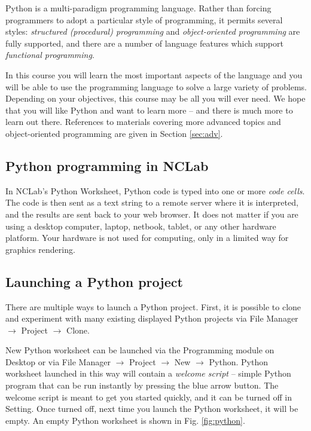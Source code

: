 \documentclass[article,A4,12pt]{llncs}
\begin{document}
Python is a multi-paradigm programming language. Rather than forcing programmers to 
adopt a particular style of programming, it permits several styles: {\em structured (procedural) 
programming} and {\em object-oriented programming} are fully supported, and there are a number 
of language features which support {\em functional programming}. 

In this course you will 
learn the most important aspects of the language and you will be able to 
use the programming language to solve a large variety of problems. 
Depending on your objectives, this course may be all you will ever need. 
We hope that you will like Python and want to learn more -- and there is much 
more to learn out there. References to materials covering more advanced topics 
and object-oriented programming are given in Section \ref{sec:adv}.

\subsection{Python programming in NCLab}

In NCLab's Python Worksheet, Python code is typed into one or more {\em code cells}. 
The code is then sent as a text string to a remote server where it is interpreted, and the 
results are sent back to your web browser. It does not matter if you are using a desktop 
computer, laptop, netbook, tablet, or any other hardware platform. Your hardware
is not used for computing, only in a limited way for graphics rendering.


\subsection{Launching a Python project}


There are multiple ways to launch a Python project. First, it is 
possible to clone and experiment with many existing displayed Python 
projects via File Manager $\rightarrow$ 
Project $\rightarrow$ Clone. 

New Python worksheet can be launched via 
the Programming module on Desktop or via File Manager $\rightarrow$ 
Project $\rightarrow$ New $\rightarrow$ Python. Python worksheet
launched in this way will contain a {\em welcome script} -- simple Python 
program that can be run instantly by pressing the blue arrow button. 
The welcome script is meant to get you started quickly, and it can 
be turned off in Setting. Once turned off, next time you launch the 
Python worksheet, it will be empty. An empty Python worksheet
is shown in Fig. \ref{fig:python}.
\end{document}
